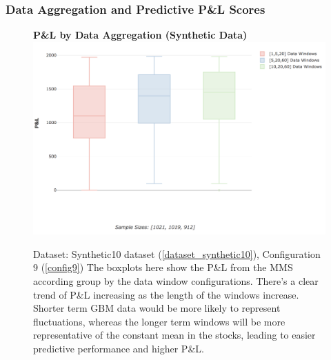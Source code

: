 \documentclass[a4paper,11pt,oneside]{article}
\theoremstyle{plain}
\theoremstyle{definition}
\begin{document}
	
	\subsubsection{Data Aggregation and Predictive P\&L Scores}\label{results_data_pl}
	
	\begin{figure}[H]
		\centering 
		\textbf{P\&L by Data Aggregation (Synthetic Data)}
		\includegraphics[scale=0.4]{images/results/data/test_aggregation_pl.png}
		\caption[P\&L by Data Aggregation (Synthetic Data)]{
			Dataset: Synthetic10 dataset (\ref{dataset_synthetic10}), Configuration 9 (\ref{config9})
			\newline  The boxplots here show the P\&L from the MMS according group by the data window configurations. There's a clear trend of P\&L increasing as the length of the windows increase. Shorter term GBM data would be more likely to represent fluctuations, whereas the longer term windows will be more representative of the constant mean in the stocks, leading to easier predictive performance and higher P\&L.}
		\label{figure-test_aggregation_pl}
	\end{figure}
	
\end{document}
